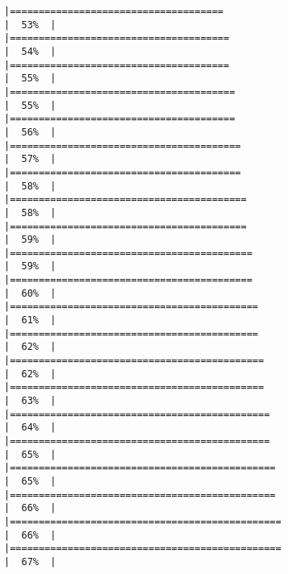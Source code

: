 \documentclass[
]{article}
\begin{document}
\begin{verbatim}
|=====================================                                 |  53%  |                                                                              |======================================                                |  54%  |                                                                              |======================================                                |  55%  |                                                                              |=======================================                               |  55%  |                                                                              |=======================================                               |  56%  |                                                                              |========================================                              |  57%  |                                                                              |========================================                              |  58%  |                                                                              |=========================================                             |  58%  |                                                                              |=========================================                             |  59%  |                                                                              |==========================================                            |  59%  |                                                                              |==========================================                            |  60%  |                                                                              |===========================================                           |  61%  |                                                                              |===========================================                           |  62%  |                                                                              |============================================                          |  62%  |                                                                              |============================================                          |  63%  |                                                                              |=============================================                         |  64%  |                                                                              |=============================================                         |  65%  |                                                                              |==============================================                        |  65%  |                                                                              |==============================================                        |  66%  |                                                                              |===============================================                       |  66%  |                                                                              |===============================================                       |  67%  |                                                                              
\end{verbatim}
\end{document}
